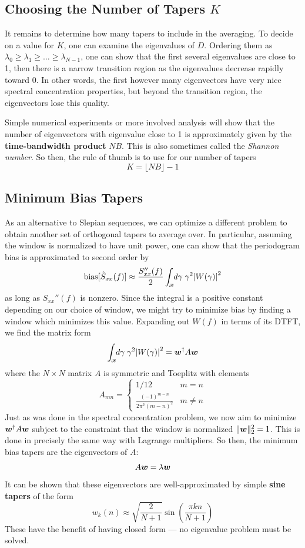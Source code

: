 \documentclass[twocolumn]{gwclass}
\newcommand{\intbw}[1]{\int_{\hspace{-0.1em}\scriptscriptstyle\mathscr{B}}\hspace{-0.25em}}
\begin{document}
\subsection{Choosing the Number of Tapers $K$}
It remains to determine how many tapers to include in the averaging. To decide on a value for $K$, one can examine the eigenvalues of $D$. Ordering them as $\lambda_0\geq \lambda_1\geq \dots\geq\lambda_{N-1}$, one can show that the first several eigenvalues are close to 1, then there is a narrow transition region as the eigenvalues decrease rapidly toward 0. In other words, the first however many eigenvectors have very nice spectral concentration properties, but beyond the transition region, the eigenvectors lose this quality. 

Simple numerical experiments or more involved analysis will show that the number of eigenvectors with eigenvalue close to 1 is approximately given by the \textbf{time-bandwidth product} $NB$. This is also sometimes called the \emph{Shannon number}. So then, the rule of thumb is to use for our number of tapers
$$ K = \lfloor NB\rfloor - 1 $$


\subsection{Minimum Bias Tapers}
As an alternative to Slepian sequences, we can optimize a different problem to obtain another set of orthogonal tapers to average over. In particular, assuming the window is normalized to have unit power, one can show that the periodogram bias is approximated to second order by
$$ \t{bias}[\hat{S}_{xx}(f)] \approx \frac{S_{xx}''(f)}{2} \intbw{1} d\gamma\;\gamma^2\abs{W(\gamma)}^2 $$
as long as $S_{xx}''(f)$ is nonzero. Since the integral is a positive constant depending on our choice of window, we might try to minimize bias by finding a window which minimizes this value. Expanding out $W(f)$ in terms of its DTFT, we find the matrix form
$$ \intbw{1} d\gamma\;\gamma^2\abs{W(\gamma)}^2 = \*w^\dagger A \*w $$
where the $N\times N$ matrix $A$ is symmetric and Toeplitz with elements
$$ A_{mn} = \begin{cases}
	1/12 & m=n \\
	\frac{(-1)^{m-n}}{2\pi^2(m-n)^2} & m\neq n
\end{cases} $$
Just as was done in the spectral concentration problem, we now aim to minimize $\boldsymbol{w}^\dagger A\boldsymbol{w}$ subject to the constraint that the window is normalized $\|\boldsymbol{w}\|_2^2=1$. This is done in precisely the same way with Lagrange multipliers. So then, the minimum bias tapers are the eigenvectors of $A$:
$$ A\boldsymbol{w} = \lambda\boldsymbol{w} $$
It can be shown that these eigenvectors are well-approximated by simple \textbf{sine tapers} of the form 
$$w_k(n)\approx \sqrt{\frac{2}{N+1}} \sin(\frac{\pi k n}{N+1})$$
These have the benefit of having closed form --- no eigenvalue problem must be solved.
\end{document}
